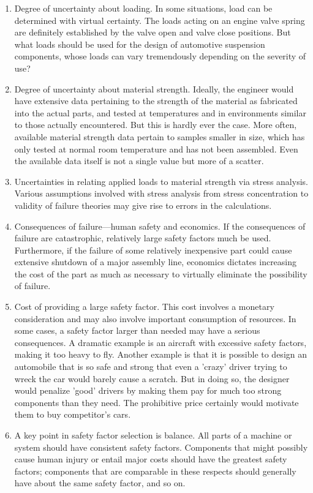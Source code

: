 \documentclass[a4paper,openany,12pt]{book}
\begin{document}
\begin{enumerate}
\item Degree of uncertainty about loading. In some situations, load can be
determined with virtual certainty. The loads acting on an engine
valve spring are definitely established by the valve open and valve
close positions. But what loads should be used for the design of
automotive suspension components, whose loads can vary tremendously
depending on the severity of use?

\item Degree of uncertainty about material strength. Ideally, the engineer
would have extensive data pertaining to the strength of the material
as fabricated into the actual parts, and tested at temperatures and
in environments similar to those actually encountered. But this is
hardly ever the case. More often, available material strength data
pertain to samples smaller in size, which has only tested at normal
room temperature and has not been assembled. Even the available data
itself is not a single value but more of a scatter.

\item Uncertainties in relating applied loads to material strength via
stress analysis. Various assumptions involved with stress analysis
from stress concentration to validity of failure theories may give
rise to errors in the calculations.

\item Consequences of failure---human safety and economics. If the
consequences of failure are catastrophic, relatively large safety
factors much be used. Furthermore, if the failure of some relatively
inexpensive part could cause extensive shutdown of a major assembly
line, economics dictates increasing the cost of the part as much as
necessary to virtually eliminate the possibility of failure.

\item Cost of providing a large safety factor. This cost involves a
monetary consideration and may also involve important consumption of
resources. In some cases, a safety factor larger than needed may have
a serious consequences. A dramatic example is an aircraft with
excessive safety factors, making it too heavy to fly. Another example
is that it is possible to design an automobile that is so safe and
strong that even a 'crazy' driver trying to wreck the car would
barely cause a scratch. But in doing so, the designer would penalize
'good' drivers by making them pay for much too strong components than
they need. The prohibitive price certainly would motivate them to buy
competitor's cars.

\item A key point in safety factor selection is balance. All parts of a
machine or system should have consistent safety factors. Components
that might possibly cause human injury or entail major costs should
have the greatest safety factors; components that are comparable in
these respects should generally have about the same safety factor,
and so on.
\end{enumerate}
\end{document}
